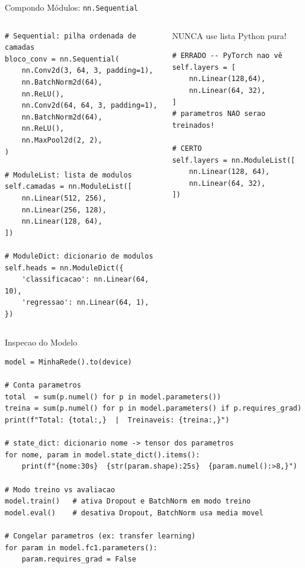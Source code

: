 \documentclass[aspectratio=169, 10pt]{beamer}
\begin{document}
\begin{frame}[fragile]{Compondo Módulos: \texttt{nn.Sequential}}
\begin{columns}
\begin{lstlisting}
# Sequential: pilha ordenada de camadas
bloco_conv = nn.Sequential(
    nn.Conv2d(3, 64, 3, padding=1),
    nn.BatchNorm2d(64),
    nn.ReLU(),
    nn.Conv2d(64, 64, 3, padding=1),
    nn.BatchNorm2d(64),
    nn.ReLU(),
    nn.MaxPool2d(2, 2),
)

# ModuleList: lista de modulos
self.camadas = nn.ModuleList([
    nn.Linear(512, 256),
    nn.Linear(256, 128),
    nn.Linear(128, 64),
])

# ModuleDict: dicionario de modulos
self.heads = nn.ModuleDict({
    'classificacao': nn.Linear(64, 10),
    'regressao': nn.Linear(64, 1),
})
\end{lstlisting}

\begin{alertblock}{NUNCA use lista Python pura!}
\begin{lstlisting}[numbers=none]
# ERRADO -- PyTorch nao vê
self.layers = [
    nn.Linear(128,64),
    nn.Linear(64, 32),
]
# parametros NAO serao treinados!

# CERTO
self.layers = nn.ModuleList([
    nn.Linear(128, 64),
    nn.Linear(64, 32),
])
\end{lstlisting}
\end{alertblock}
\end{columns}
\end{frame}


\begin{frame}[fragile]{Inspecao do Modelo}
\begin{lstlisting}
model = MinhaRede().to(device)

# Conta parametros
total  = sum(p.numel() for p in model.parameters())
treina = sum(p.numel() for p in model.parameters() if p.requires_grad)
print(f"Total: {total:,}  |  Treinaveis: {treina:,}")

# state_dict: dicionario nome -> tensor dos parametros
for nome, param in model.state_dict().items():
    print(f"{nome:30s}  {str(param.shape):25s}  {param.numel():>8,}")

# Modo treino vs avaliacao
model.train()   # ativa Dropout e BatchNorm em modo treino
model.eval()    # desativa Dropout, BatchNorm usa media movel

# Congelar parametros (ex: transfer learning)
for param in model.fc1.parameters():
    param.requires_grad = False
\end{lstlisting}
\end{frame}
\end{document}
